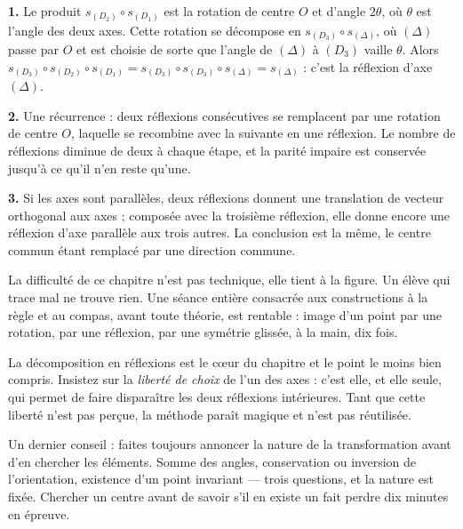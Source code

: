 \begin{corrige}
\textbf{1.} Le produit $s_{(D_{2})} \circ s_{(D_{1})}$ est la rotation de
centre $O$ et d'angle $2\theta$, où $\theta$ est l'angle des deux axes. Cette
rotation se décompose en $s_{(D_{3})} \circ s_{(\Delta)}$, où $(\Delta)$ passe
par $O$ et est choisie de sorte que l'angle de $(\Delta)$ à $(D_{3})$ vaille
$\theta$. Alors
$s_{(D_{3})} \circ s_{(D_{2})} \circ s_{(D_{1})}
= s_{(D_{3})} \circ s_{(D_{3})} \circ s_{(\Delta)} = s_{(\Delta)}$ : c'est la
réflexion d'axe $(\Delta)$.

\textbf{2.} Une récurrence : deux réflexions consécutives se remplacent par
une rotation de centre $O$, laquelle se recombine avec la suivante en une
réflexion. Le nombre de réflexions diminue de deux à chaque étape, et la
parité impaire est conservée jusqu'à ce qu'il n'en reste qu'une.

\textbf{3.} Si les axes sont parallèles, deux réflexions donnent une
translation de vecteur orthogonal aux axes ; composée avec la troisième
réflexion, elle donne encore une réflexion d'axe parallèle aux trois autres.
La conclusion est la même, le centre commun étant remplacé par une direction
commune.
\end{corrige}

\begin{notepourlaclasse}
La difficulté de ce chapitre n'est pas technique, elle tient à la figure. Un
élève qui trace mal ne trouve rien. Une séance entière consacrée aux
constructions à la règle et au compas, avant toute théorie, est rentable :
image d'un point par une rotation, par une réflexion, par une symétrie
glissée, à la main, dix fois.

La décomposition en réflexions est le cœur du chapitre et le point le moins
bien compris. Insistez sur la \emph{liberté de choix} de l'un des axes :
c'est elle, et elle seule, qui permet de faire disparaître les deux
réflexions intérieures. Tant que cette liberté n'est pas perçue, la méthode
paraît magique et n'est pas réutilisée.

Un dernier conseil : faites toujours annoncer la nature de la transformation
avant d'en chercher les éléments. Somme des angles, conservation ou inversion
de l'orientation, existence d'un point invariant — trois questions, et la
nature est fixée. Chercher un centre avant de savoir s'il en existe un fait
perdre dix minutes en épreuve.
\end{notepourlaclasse}

